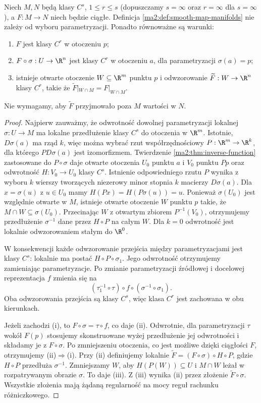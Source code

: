 \begin{stwierdzenie}
\label{ma2:prop:smooth-map-characterizations}
Niech $M,N$ będą klasy $C^s$, $1\le r\le s$ (dopuszczamy
$s=\infty$ oraz $r=\infty$ dla $s=\infty$), a $F:M\to N$
niech będzie ciągłe. Definicja
\ref{ma2:def:smooth-map-manifolds} nie zależy od
wyboru parametryzacji. Ponadto równoważne są warunki:
\begin{enumerate}[label=(\roman*)]
\item $F$ jest klasy $C^r$ w otoczeniu $p$;
\item $F\circ\sigma:U\to\R^n$ jest klasy $C^r$
w otoczeniu $a$, dla parametryzacji $\sigma(a)=p$;
\item istnieje otwarte otoczenie $W\subseteq\R^m$ punktu $p$
i odwzorowanie $\widetilde F:W\to\R^n$ klasy $C^r$,
takie że $\widetilde F|_{W\cap M}=F|_{W\cap M}$.
\end{enumerate}
Nie wymagamy, aby $\widetilde F$ przyjmowało poza $M$
wartości w $N$.
\end{stwierdzenie}
\begin{proof}
Najpierw zauważmy, że odwrotność dowolnej parametryzacji
lokalnej $\sigma:U\to M$ ma lokalne przedłużenie klasy
$C^s$ do otoczenia w $\R^m$. Istotnie, $D\sigma(a)$ ma
rząd $k$, więc można wybrać rzut współrzędnościowy
$P:\R^m\to\R^k$, dla którego $P D\sigma(a)$ jest
izomorfizmem. Twierdzenie \ref{ma2:thm:inverse-function}
zastosowane do $P\circ\sigma$ daje otwarte otoczenia
$U_0$ punktu $a$ i $V_0$ punktu $Pp$ oraz odwrotność
$H:V_0\to U_0$ klasy $C^s$. Istnienie odpowiedniego
rzutu $P$ wynika z wyboru $k$ wierszy tworzących
niezerowy minor stopnia $k$ macierzy $D\sigma(a)$.
Dla $x=\sigma(u)$ z $u\in U_0$ mamy
$H(Px)=H(P\sigma(u))=u$. Ponieważ $\sigma(U_0)$
jest względnie otwarte w $M$, istnieje otwarte
otoczenie $W$ punktu $p$ takie, że
$M\cap W\subseteq\sigma(U_0)$. Przecinając $W$
z otwartym zbiorem $P^{-1}(V_0)$, otrzymujemy
przedłużenie $\sigma^{-1}$ dane przez $H\circ P$
na całym $W$. Dla $k=0$ odwrotność jest lokalnie
odwzorowaniem stałym do $\R^0$.

W konsekwencji każde odwzorowanie przejścia między
parametryzacjami jest klasy $C^s$: lokalnie ma postać
$H\circ P\circ\sigma_1$. Jego odwrotność otrzymujemy
zamieniając parametryzacje. Po zmianie parametryzacji
źródłowej i docelowej reprezentacja $f$ zmienia się na
\[
 (\tau_1^{-1}\circ\tau)\circ f\circ
 (\sigma^{-1}\circ\sigma_1).
\]
Oba odwzorowania przejścia są klasy $C^s$, więc klasa
$C^r$ jest zachowana w obu kierunkach.

Jeżeli zachodzi (i), to $F\circ\sigma=\tau\circ f$,
co daje (ii). Odwrotnie, dla parametryzacji $\tau$ wokół
$F(p)$ stosujemy skonstruowane wyżej przedłużenie jej
odwrotności i składamy je z $F\circ\sigma$. Po zmniejszeniu
otoczenia, co jest możliwe dzięki ciągłości $F$, otrzymujemy
(ii)$\Rightarrow$(i).
Przy (ii) definiujemy lokalnie
$\widetilde F=(F\circ\sigma)\circ H\circ P$,
gdzie $H\circ P$ przedłuża $\sigma^{-1}$.
Zmniejszamy $W$, aby $H(P(W))\subseteq U$ i
$M\cap W$ leżał w rozpatrywanym obrazie $\sigma$.
To daje (iii). Z (iii) wynika (ii) przez złożenie
$\widetilde F\circ\sigma$. Wszystkie złożenia mają
żądaną regularność na mocy reguł rachunku różniczkowego.
\end{proof}

